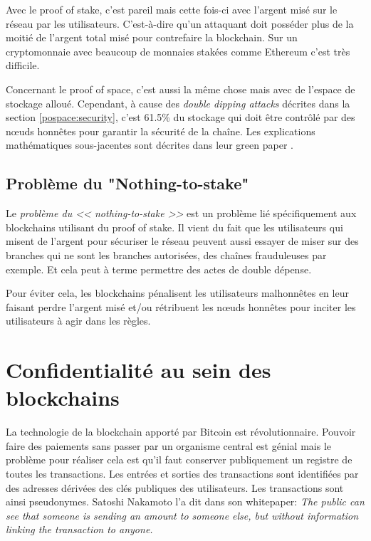 Avec le proof of stake, c'est pareil mais cette fois-ci avec l'argent misé sur le réseau par les utilisateurs. C'est-à-dire qu'un attaquant doit posséder plus de la moitié de l'argent total misé pour contrefaire la blockchain. Sur un cryptomonnaie avec beaucoup de monnaies stakées comme Ethereum c'est très difficile.

Concernant le proof of space, c'est aussi la même chose mais avec de l'espace de stockage alloué. Cependant, à cause des \emph{double dipping attacks} décrites dans la section \ref{pospace:security}, c'est 61.5\% du stockage qui doit être contrôlé par des nœuds honnêtes pour garantir la sécurité de la chaîne. Les explications mathématiques sous-jacentes sont décrites dans leur green paper \cite{chia:greenpaper}.

\subsection{Problème du "Nothing-to-stake"}

Le \emph{problème du << nothing-to-stake >>} est un problème lié spécifiquement aux blockchains utilisant du proof of stake. Il vient du fait que les utilisateurs qui misent de l'argent pour sécuriser le réseau peuvent aussi essayer de miser sur des branches qui ne sont les branches autorisées, des chaînes frauduleuses par exemple. Et cela peut à terme permettre des actes de double dépense.

Pour éviter cela, les blockchains pénalisent les utilisateurs malhonnêtes en leur faisant perdre l'argent misé et/ou rétribuent les nœuds honnêtes pour inciter les utilisateurs à agir dans les règles.

\section{Confidentialité au sein des blockchains}

La technologie de la blockchain apporté par Bitcoin est révolutionnaire. Pouvoir faire des paiements sans passer par un organisme central est génial mais le problème pour réaliser cela est qu'il faut conserver publiquement un registre de toutes les transactions. Les entrées et sorties des transactions sont identifiées par des adresses dérivées des clés publiques des utilisateurs. Les transactions sont ainsi pseudonymes. Satoshi Nakamoto l'a dit dans son whitepaper: \textit{The public can see that someone is sending an amount to someone else, but without information linking the transaction to anyone.}

